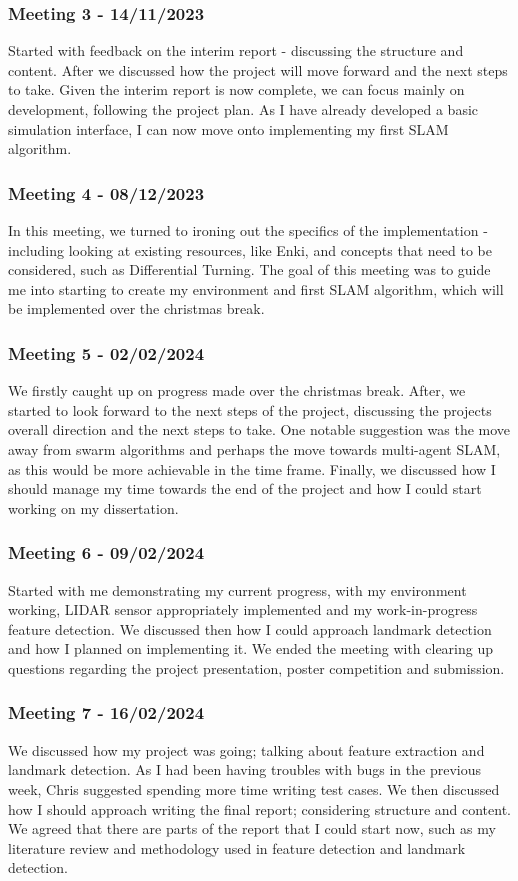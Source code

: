 \documentclass[12pt]{article}
\begin{document}
\subsubsection{Meeting 3 - 14/11/2023}
Started with feedback on the interim report - discussing the structure and content. After we discussed how the project will
move forward and the next steps to take. Given the interim report is now complete, we can focus mainly on development, following
the project plan. As I have already developed a basic simulation interface, I can now move onto implementing my first SLAM algorithm.
\subsubsection{Meeting 4 - 08/12/2023}
In this meeting, we turned to ironing out the specifics of the implementation - including looking at existing resources, like
Enki, and concepts that need to be considered, such as Differential Turning. The goal of this meeting was to guide me into
starting to create my environment and first SLAM algorithm, which will be implemented over the christmas break.
\subsubsection{Meeting 5 - 02/02/2024}
We firstly caught up on progress made over the christmas break. After, we started to look forward to the next steps of the project,
discussing the projects overall direction and the next steps to take. One notable suggestion was the move away from swarm algorithms
and perhaps the move towards multi-agent SLAM, as this would be more achievable in the time frame. Finally, we discussed how I
should manage my time towards the end of the project and how I could start working on my dissertation.
\subsubsection{Meeting 6 - 09/02/2024}
Started with me demonstrating my current progress, with my environment working, LIDAR sensor appropriately implemented and
my work-in-progress feature detection. We discussed then how I could approach landmark detection and how I planned on implementing
it. We ended the meeting with clearing up questions regarding the project presentation, poster competition and submission.
\subsubsection{Meeting 7 - 16/02/2024}
We discussed how my project was going; talking about feature extraction and landmark detection. As I had been having troubles
with bugs in the previous week, Chris suggested spending more time writing test cases. We then discussed how I should approach
writing the final report; considering structure and content. We agreed that there are parts of the report that I could start
now, such as my literature review and methodology used in feature detection and landmark detection.
\end{document}
